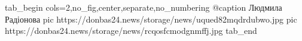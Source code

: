  
 
 
 
 

\ifcmt
  tab_begin cols=2,no_fig,center,separate,no_numbering
     @caption Людмила Радіонова
     pic https://donbas24.news/storage/news/uqued82mqdrdubwo.jpg
     pic https://donbas24.news/storage/news/rcqosfcmodgnmffj.jpg
  tab_end
\fi
